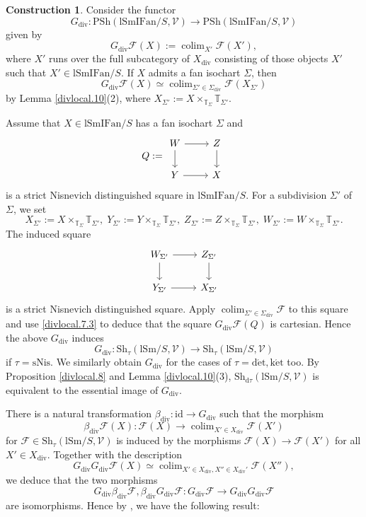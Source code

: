 \documentclass[10pt]{amsart}
\theoremstyle{definition}
\newtheorem{const}[thm]{Construction}
\theoremstyle{remark}
\numberwithin{equation}{subsection}
\newcommand{\T}{\mathbb{T}}
\newcommand{\cF}{\mathcal{F}}
\newcommand{\cV}{\mathcal{V}}
\newcommand{\colim}{\mathop{\mathrm{colim}}}
\newcommand{\id}{\mathrm{id}}
\newcommand{\colimit}{\mathop{\mathrm{colim}}}
\newcommand{\lSm}{\mathrm{lSm}}
\newcommand{\lSmIFan}{\mathrm{lSmIFan}}
\newcommand{\infPsh}{\mathrm{PSh}}
\newcommand{\infShv}{\mathrm{Sh}}
\newcommand{\divi}{\mathrm{div}}
\newcommand{\dtau}{\mathrm{d}\tau}
\newcommand{\sNis}{\mathrm{sNis}}
\newcommand{\ketale}{\mathrm{k\acute{e}t}}
\newcommand{\detale}{\mathrm{d\acute{e}t}}
\begin{document}
\begin{const}
\label{divlocal.7}
Consider the functor
\[
G_{\divi}\colon \infPsh(\lSmIFan/S,\cV)
\to
\infPsh(\lSmIFan/S,\cV)
\]
given by
\begin{equation}
\label{divlocal.7.1}
G_{\divi}\cF(X)
:=
\colimit_{X'}\cF(X'),
\end{equation}
where $X'$ runs over the full subcategory of $X_{\divi}$ consisting of those objects $X'$ such that $X'\in \lSmIFan/S$.
If $X$ admits a fan isochart $\Sigma$, then
\begin{equation}
\label{divlocal.7.3}
G_{\divi}\cF(X)
\simeq
\colimit_{\Sigma'\in \Sigma_{\divi}}\cF(X_{\Sigma'})
\end{equation}
by Lemma \ref{divlocal.10}(2), where $X_{\Sigma'}:=X\times_{\T_\Sigma}\T_{\Sigma'}$.

Assume that $X\in \lSmIFan/S$ has a fan isochart $\Sigma$ and
\begin{equation}
\label{divlocal.7.2}
Q
:=
\begin{tikzcd}
W\ar[d]\ar[r]&
Z\ar[d]
\\
Y\ar[r]&
X
\end{tikzcd}
\end{equation}
is a strict Nisnevich distinguished square in $\lSmIFan/S$.
For a subdivision $\Sigma'$ of $\Sigma$, we set
\[
X_{\Sigma'}:=X\times_{\T_{\Sigma}}\T_{\Sigma'},
\;
Y_{\Sigma'}:=Y\times_{\T_{\Sigma}}\T_{\Sigma'},
\;
Z_{\Sigma'}:=Z\times_{\T_{\Sigma}}\T_{\Sigma'},
\;
W_{\Sigma'}:=W\times_{\T_{\Sigma}}\T_{\Sigma'}.
\]
The induced square
\[
\begin{tikzcd}
W_{\Sigma'}\ar[d]\ar[r]&
Z_{\Sigma'}\ar[d]
\\
Y_{\Sigma'}\ar[r]&
X_{\Sigma'}
\end{tikzcd}
\]
is a strict Nisnevich distinguished square.
Apply $\colim_{\Sigma'\in \Sigma_{\divi}}\cF$ to this square and use \eqref{divlocal.7.3} to deduce that the square $G_{\divi}\cF(Q)$ is cartesian.
Hence the above $G_{\divi}$ induces 
\[
G_{\divi}
\colon
\infShv_{\tau}(\lSm/S,\cV)
\to
\infShv_{\tau}(\lSm/S,\cV)
\]
if $\tau=\sNis$.
We similarly obtain $G_{\divi}$ for the cases of $\tau=\detale,\ketale$ too.
By Proposition \ref{divlocal.8} and Lemma \ref{divlocal.10}(3), $\infShv_{\dtau}(\lSm/S,\cV)$ is equivalent to the essential image of $G_{\divi}$.

There is a natural transformation $\beta_{\divi}\colon \id \to G_{\divi}$ such that the morphism
\[
\beta_{\divi}\cF(X) \colon \cF(X)\to \colimit_{X'\in X_{\divi}}\cF(X')
\]
for $\cF\in \infShv_{\tau}(\lSm/S,\cV)$ is induced by the morphisms $\cF(X)\to \cF(X')$ for all $X'\in X_{\divi}$.
Together with the description
\[
G_{\divi}G_{\divi}\cF(X)
\simeq
\colimit_{X'\in X_{\divi},X''\in X_{\divi}'}\cF(X''),
\]
we deduce that the two morphisms
\[
G_{\divi}\beta_{\divi}\cF,\beta_{\divi}G_{\divi}\cF
\colon
G_{\divi}\cF\to G_{\divi}G_{\divi}\cF
\]
are isomorphisms.
Hence by \cite[Proposition 5.2.7.4]{HTT}, we have the following result:
\end{const}
\end{document}
